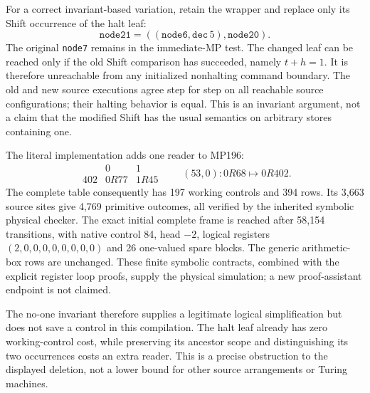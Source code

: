 For a correct invariant-based variation, retain the wrapper and replace
only its Shift occurrence of the halt leaf:
\[
 \mathtt{node21}=((\mathtt{node6},\mathtt{dec}\,5),\mathtt{node20}).
\]
The original \texttt{node7} remains in the immediate-MP test. The changed
leaf can be reached only if the old Shift comparison has succeeded,
namely $t+h=1$. It is therefore unreachable from any initialized
nonhalting command boundary. The old and new source executions agree
step for step on all reachable source configurations; their halting
behavior is equal. This is an invariant argument, not a claim that the
modified Shift has the usual semantics on arbitrary stores containing
one.

The literal implementation adds one reader to MP196:
\[
\begin{array}{c|cc}
 &0&1\\\hline
402&0R77&1R45
\end{array}
\qquad
(53,0):0R68\longmapsto0R402.
\]
The complete table consequently has 197 working controls and 394 rows.
Its 3,663 source sites give 4,769 primitive outcomes, all verified by
the inherited symbolic physical checker. The exact initial complete
frame is reached after 58,154 transitions, with native control 84,
head $-2$, logical registers $(2,0,0,0,0,0,0,0,0)$ and 26 one-valued
spare blocks. The generic arithmetic-box rows are unchanged. These
finite symbolic contracts, combined with the explicit register loop
proofs, supply the physical simulation; a new proof-assistant endpoint
is not claimed.

The no-one invariant therefore supplies a legitimate logical
simplification but does not save a control in this compilation. The
halt leaf already has zero working-control cost, while preserving its
ancestor scope and distinguishing its two occurrences costs an extra
reader. This is a precise obstruction to the displayed deletion, not
a lower bound for other source arrangements or Turing machines.
